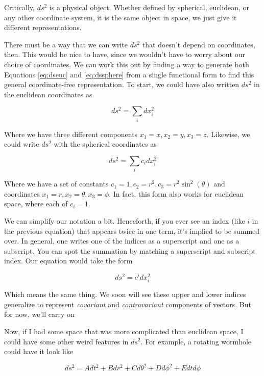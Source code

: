 \documentclass{article}
\begin{document}
Critically, $ds^2$ is a physical object. Whether defined by spherical, euclidean, or any other coordinate system, it is the same object in space, we just give it different representations.

There must be a way that we can write $ds^2$ that doesn't depend on coordinates, then. This would be nice to have, since we wouldn't have to worry about our choice of coordinates. We can work this out by finding a way to generate both Equations \ref{eq:dseuc} and \ref{eq:dssphere} from a single functional form to find this general coordinate-free representation. To start, we could have also written $ds^2$ in the euclidean coordinates as

\begin{equation}
    ds^2 = \sum_i dx_i^2
\end{equation}

Where we have three different components $x_1 = x, x_2 = y, x_3 = z$. Likewise, we could write $ds^2$ with the spherical coordinates as

\begin{equation}
    ds^2 = \sum_i c_i dx_i^2
\end{equation}

Where we have a set of constants $c_1 = 1, c_2 = r^2, c_3 = r^2\sin^2(\theta)$ and coordinates $x_1 = r, x_2 = \theta, x_3 = \phi$. In fact, this form also works for euclidean space, where each of $c_i = 1$. 

We can simplify our notation a bit. Henceforth, if you ever see an index (like $i$ in the previous equation) that appears twice in one term, it's implied to be summed over. In general, one writes one of the indices as a superscript and one as a subscript. You can spot the summation by matching a superscript and subscript index. Our equation would take the form

\begin{equation}
    ds^2 = c^i dx_i^2
\end{equation}

Which means the same thing. We soon will see these upper and lower indices generalize to represent \textit{covariant} and \textit{contravariant} components of vectors. But for now, we'll carry on

Now, if I had some space that was more complicated than euclidean space, I could have some other weird features in $ds^2$. For example, a rotating wormhole could have it look like

\begin{equation}
    ds^2 = Adt^2 + Bdr^2 + Cd\theta^2 + Dd\phi^2 + Edtd\phi
\end{equation}
\end{document}
